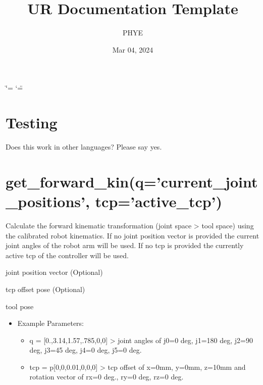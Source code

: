 \documentclass[letterpaper,10pt,english]{sphinxmanual}
\title{UR Documentation Template}
\date{Mar 04, 2024}
\author{PHYE}
\begin{document}
\ifdefined\shorthandoff
  \ifnum\catcode`\=\string=\active\shorthandoff{=}\fi
  \ifnum\catcode`\"=\active{}\fi
\fi

\pagestyle{empty}
\sphinxmaketitle
\pagestyle{plain}
\sphinxtableofcontents
\pagestyle{normal}
\label{\detokenize{index::doc}}


\sphinxstepscope


\chapter{Testing}
\label{\detokenize{test:testing}}\label{\detokenize{test::doc}}
\sphinxAtStartPar
Does this work in other languages? Please say yes.

\sphinxstepscope


\chapter{get\_forward\_kin(q=’current\_joint\_positions’, tcp=’active\_tcp’)}
\label{\detokenize{get_forward_kin_q_current_joint_positions:get-forward-kin-q-current-joint-positions-tcp-active-tcp}}\label{\detokenize{get_forward_kin_q_current_joint_positions::doc}}
\sphinxAtStartPar
Calculate the forward kinematic transformation (joint space \sphinxhyphen{}\textgreater{} tool space) using the calibrated robot kinematics. If no joint position vector is provided the current joint angles of the robot arm will be used. If no tcp is provided the currently active tcp of the controller will be used.

\sphinxAtStartPar
{}

\sphinxAtStartPar
{} joint position vector (Optional)

\sphinxAtStartPar
{} tcp offset pose (Optional)

\sphinxAtStartPar
{}

\sphinxAtStartPar
tool pose

\sphinxAtStartPar
{} 
\begin{itemize}
\item {} 
\sphinxAtStartPar
Example Parameters:
\begin{itemize}
\item {} 
\sphinxAtStartPar
q = {[}0.,3.14,1.57,.785,0,0{]} \sphinxhyphen{}\textgreater{} joint angles of j0=0 deg, j1=180 deg, j2=90 deg, j3=45 deg, j4=0 deg, j5=0 deg.

\item {} 
\sphinxAtStartPar
tcp = p{[}0,0,0.01,0,0,0{]} \sphinxhyphen{}\textgreater{} tcp offset of x=0mm, y=0mm, z=10mm and rotation vector of rx=0 deg., ry=0 deg, rz=0 deg.

\end{itemize}

\end{itemize}



\renewcommand{\indexname}{Index}
\printindex
\end{document}
